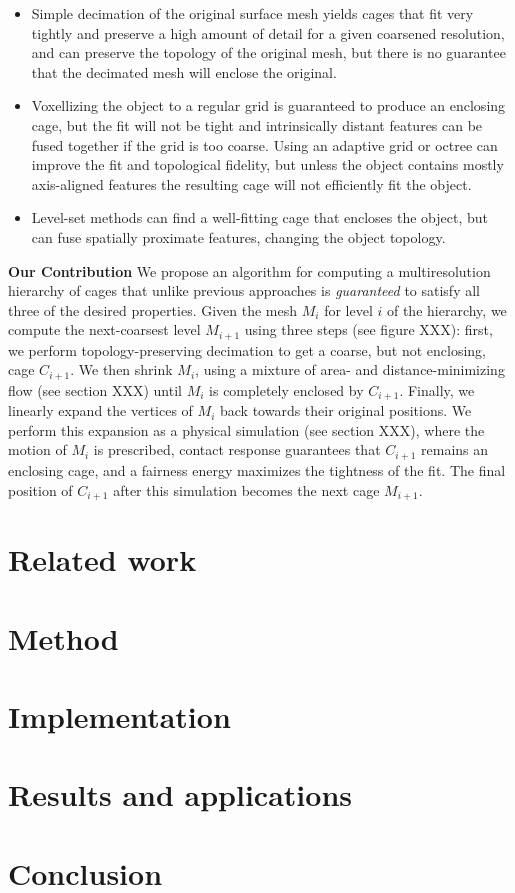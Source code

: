 \documentclass{acmtog}
\begin{document}
\begin{itemize}
\item Simple decimation of the original surface mesh yields cages that fit very tightly and preserve a high amount of detail for a given coarsened resolution, and can preserve the topology of the original mesh, but there is no guarantee that the decimated mesh will enclose the original.
\item Voxellizing the object to a regular grid is guaranteed to produce an enclosing cage, but the fit will not be tight and intrinsically distant features can be fused together if the grid is too coarse. Using an adaptive grid or octree can improve the fit and topological fidelity, but unless the object contains mostly axis-aligned features the resulting cage will not efficiently fit the object.
\item Level-set methods can find a well-fitting cage that encloses the object, but can fuse spatially proximate features, changing the object topology.
\end{itemize}

\noindent\textbf{Our Contribution} We propose an algorithm for computing a multiresolution hierarchy of cages that unlike previous approaches is \emph{guaranteed} to satisfy all three of the desired properties. Given the mesh $M_i$ for level $i$ of the hierarchy, we compute the next-coarsest level $M_{i+1}$ using three steps (see figure XXX): first, we perform topology-preserving decimation to get a coarse, but not enclosing, cage $C_{i+1}$. We then shrink $M_i$, using a mixture of area- and distance-minimizing flow (see section XXX) until $M_i$ is completely enclosed by $C_{i+1}$. Finally, we linearly expand the vertices of $M_i$ back towards their original positions. We perform this expansion as a physical simulation (see section XXX), where the motion of $M_i$ is prescribed, contact response guarantees that $C_{i+1}$ remains an enclosing cage, and a fairness energy maximizes the tightness of the fit. The final position of $C_{i+1}$ after this simulation becomes the next cage $M_{i+1}$.

\section{Related work}
\label{sec:related}

\section{Method}
\label{sec:method}

\section{Implementation}
\label{sec:implementation}

\section{Results and applications}
\label{sec:results}

\section{Conclusion}
\label{sec:colnclusion}

\begin{acks}
\end{acks}





\end{document}
